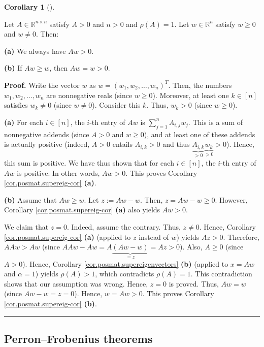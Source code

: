 \documentclass[numbers=enddot,12pt,final,onecolumn,notitlepage]{scrartcl}%
\numberwithin{exer}{subsection}
\theoremstyle{definition}
\newtheorem{coro}[theo]{Corollary}
\newenvironment{corollary}[1][]
{\begin{coro}[#1]\begin{leftbar}}
{\end{leftbar}\end{coro}}
\newenvironment{proof}[1][Proof]{\noindent\textbf{#1.} }{\ \rule{0.5em}{0.5em}}
\let\sumnonlimits\sum
\renewcommand{\sum}{\sumnonlimits\limits}
\begin{document}
\begin{corollary}
\label{cor.posmat.supereig-cor}Let $A\in\mathbb{R}^{n\times n}$ satisfy $A>0$
and $n>0$ and $\rho\left(  A\right)  =1$. Let $w\in\mathbb{R}^{n}$ satisfy
$w\geq0$ and $w\neq0$. Then: \medskip

\textbf{(a)} We always have $Aw>0$. \medskip

\textbf{(b)} If $Aw\geq w$, then $Aw=w>0$.
\end{corollary}

\begin{proof}
Write the vector $w$ as $w=\left(  w_{1},w_{2},\ldots,w_{n}\right)  ^{T}$.
Then, the numbers $w_{1},w_{2},\ldots,w_{n}$ are nonnegative reals (since
$w\geq0$). Moreover, at least one $k\in\left[  n\right]  $ satisfies
$w_{k}\neq0$ (since $w\neq0$). Consider this $k$. Thus, $w_{k}>0$ (since
$w\geq0$). \medskip

\textbf{(a)} For each $i\in\left[  n\right]  $, the $i$-th entry of $Aw$ is
$\sum_{j=1}^{n}A_{i,j}w_{j}$. This is a sum of nonnegative addends (since
$A>0$ and $w\geq0$), and at least one of these addends is actually positive
(indeed, $A>0$ entails $A_{i,k}>0$ and thus $\underbrace{A_{i,k}}%
_{>0}\underbrace{w_{k}}_{>0}>0$). Hence, this sum is positive. We have thus
shown that for each $i\in\left[  n\right]  $, the $i$-th entry of $Aw$ is
positive. In other words, $Aw>0$. This proves Corollary
\ref{cor.posmat.supereig-cor} \textbf{(a)}. \medskip

\textbf{(b)} Assume that $Aw\geq w$. Let $z:=Aw-w$. Then, $z=Aw-w\geq0$.
However, Corollary \ref{cor.posmat.supereig-cor} \textbf{(a)} also yields
$Aw>0$.

We claim that $z=0$. Indeed, assume the contrary. Thus, $z\neq0$. Hence,
Corollary \ref{cor.posmat.supereig-cor} \textbf{(a)} (applied to $z$ instead
of $w$) yields $Az>0$. Therefore, $AAw>Aw$ (since $AAw-Aw=A\underbrace{\left(
Aw-w\right)  }_{=z}=Az>0$). Also, $A\geq0$ (since $A>0$). Hence, Corollary
\ref{cor.posmat.supereigenvectors} \textbf{(b)} (applied to $x=Aw$ and
$\alpha=1$) yields $\rho\left(  A\right)  >1$, which contradicts $\rho\left(
A\right)  =1$. This contradiction shows that our assumption was wrong. Hence,
$z=0$ is proved. Thus, $Aw=w$ (since $Aw-w=z=0$). Hence, $w=Aw>0$. This proves
Corollary \ref{cor.posmat.supereig-cor} \textbf{(b)}.
\end{proof}

\subsection{Perron--Frobenius theorems}
\end{document}
